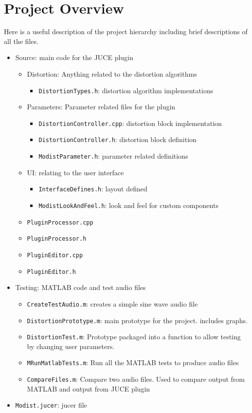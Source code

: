 \documentclass{article}
\begin{document}
\pagebreak

\section{Project Overview}
Here is a useful description of the project hierarchy including brief descriptions
of all the files.

\begin{itemize}
  \item Source: main code for the JUCE plugin
  \begin{itemize}
    \item Distortion: Anything related to the distortion algorithms
    \begin{itemize}
      \item \lstinline{DistortionTypes.h}: distortion algorithm implementations
    \end{itemize}
    \item Parameters: Parameter related files for the plugin
    \begin{itemize}
      \item \lstinline{DistortionController.cpp}: distortion block implementation
      \item \lstinline{DistortionController.h}: distortion block definition
      \item \lstinline{ModistParameter.h}: parameter related definitions
    \end{itemize}
    \item UI: relating to the user interface
    \begin{itemize}
      \item \lstinline{InterfaceDefines.h}: layout defined
      \item \lstinline{ModistLookAndFeel.h}: look and feel for custom components
    \end{itemize}
    \item \lstinline{PluginProcessor.cpp}
    \item \lstinline{PluginProcessor.h}
    \item \lstinline{PluginEditor.cpp}
    \item \lstinline{PluginEditor.h}
  \end{itemize}
  \item Testing: MATLAB code and test audio files
  \begin{itemize}
    \item \lstinline{CreateTestAudio.m}: creates a simple sine wave audio file
    \item \lstinline{DistortionPrototype.m}: main prototype for the project. includes graphs.
    \item \lstinline{DistortionTest.m}: Prototype packaged into a function to allow testing by changing user parameters.
    \item \lstinline{MRunMatlabTests.m}: Run all the MATLAB tests to produce audio files
    \item \lstinline{CompareFiles.m}: Compare two audio files. Used to compare output from MATLAB and output from JUCE plugin
  \end{itemize}
  \item \lstinline{Modist.jucer}: jucer file
\end{itemize}
\end{document}
